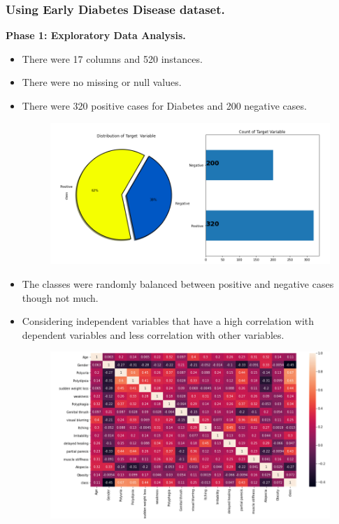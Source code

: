 \documentclass[11pt]{article}
\begin{document}
\begin{center}
	\subsubsection*{Using Early Diabetes Disease dataset.}
\end{center}
\textbf{Phase 1: Exploratory Data Analysis.}
	\begin{itemize}
		\item There were 17 columns and 520 instances.\\
		\item There were no missing or null values.\\
		\item There were 320 positive cases for Diabetes and 200 negative cases.\\
		\begin{figure}[h]
			\centerline{\small 
				\includegraphics[height=0.3\textheight]  {pie}}
		\end{figure}
		
		\item The classes were randomly balanced between positive and negative cases though not much.\\
		\item Considering independent variables that have a high correlation with dependent variables and less correlation with other variables.\\
		\begin{figure}[h]
			\centerline{\small 
				\includegraphics[height=0.2\textheight]  {corr}}
		\end{figure}
	

\end{itemize}
\end{document}
